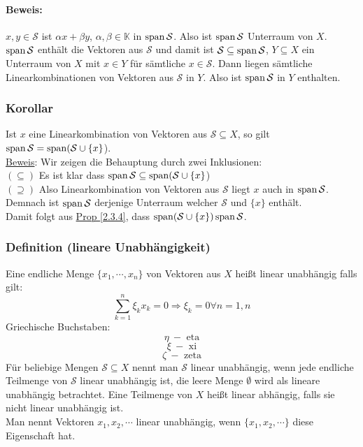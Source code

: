\paragraph{Beweis:} $x,y\in \mathcal{S}$ ist $\alpha x+\beta y$, $\alpha,\beta\in\mathbb{K}$ in $\operatorname{span}\mathcal{S}$. Also ist $\operatorname{span}\mathcal{S}$ Unterraum von $X$. $\operatorname{span}\mathcal{S}$ enthält die Vektoren aus $\mathcal{S}$ und damit ist $\mathcal{S}\subseteq \operatorname{span}\mathcal{S}$, $Y\subseteq X$ ein Unterraum von $X$ mit $x\in Y$ für sämtliche $x\in\mathcal{S}$. Dann liegen sämtliche Linearkombinationen von Vektoren aus $\mathcal{S}$ in $Y$. Also ist $\operatorname{span}\mathcal{S}$ in $Y$ enthalten.
\subsubsection{Korollar}
Ist $x$ eine Linearkombination von Vektoren aus $\mathcal{S}\subseteq X$, so gilt $\operatorname{span}\mathcal{S}=\operatorname{span}(\mathcal{S}\cup \{x\}$).\\
\underline{Beweis}: Wir zeigen die Behauptung durch zwei Inklusionen:\\
$(\subseteq )$ Es ist klar dass $\operatorname{span}\mathcal{S}\subseteq\operatorname{span}(\mathcal{S}\cup\{x\}$)\\
$(\supseteq )$ Also Linearkombination von Vektoren aus $\mathcal{S}$ liegt $x$ auch in $\operatorname{span}\mathcal{S}$.\\
Demnach ist $\operatorname{span}\mathcal{S}$ derjenige Unterraum welcher $\mathcal{S}$ und $\{x\}$ enthält.\\
Damit folgt aus \hyperref[2.3.4]{Prop \ref*{2.3.4}}, dass $\operatorname{span}(\mathcal{S}\cup\{x\})\operatorname{span}\mathcal{S}$.
\subsubsection{Definition (lineare Unabhängigkeit)}
\label{unabhaengig}
Eine endliche Menge $\{x_1,\cdots ,x_n\}$ von Vektoren aus $X$ heißt linear unabhängig falls gilt:
\[\sum^n_{k=1} \xi _k x_k = 0 \Rightarrow \xi _k =0 \forall n=1,n\]
Griechische Buchstaben:
\[\eta \ - \text{ eta}\]
\[\xi \ - \text{ xi}\]
\[\zeta \ - \text{ zeta} \]
Für beliebige Mengen $\mathcal{S}\subseteq X$ nennt man $\mathcal{S}$ linear unabhängig, wenn jede endliche Teilmenge von $\mathcal{S}$ linear unabhängig ist, die leere Menge $\emptyset$ wird als lineare unabhängig betrachtet.  Eine Teilmenge von $X$ heißt linear abhängig, falls sie nicht linear unabhängig ist.\\
Man nennt Vektoren $x_1 ,x_2 ,\cdots $ linear unabhängig, wenn $\{x_1,x_2,\cdots \}$ diese Eigenschaft hat.
